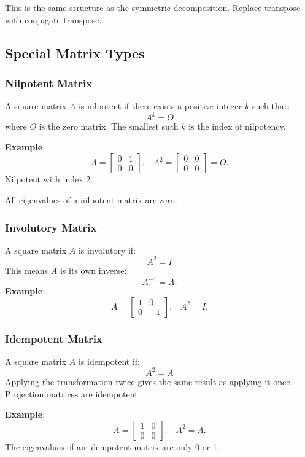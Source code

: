 \documentclass[
]{article}
\begin{document}
This is the same structure as the symmetric decomposition. Replace
transpose with conjugate transpose.

\subsection{Special Matrix Types}\label{special-matrix-types}

\subsubsection{Nilpotent Matrix}\label{nilpotent-matrix}

A square matrix \(A\) is nilpotent if there exists a positive integer
\(k\) such that:
\[
A^k = O
\]
where \(O\) is the zero matrix. The smallest such \(k\) is the index of
nilpotency.

\textbf{Example}:
\[
A =
\begin{bmatrix}
0 & 1 \\
0 & 0
\end{bmatrix}. \quad A^2 = \begin{bmatrix} 0 & 0 \\ 0 & 0 \end{bmatrix} = O.
\]
Nilpotent with index 2.

All eigenvalues of a nilpotent matrix are zero.

\subsubsection{Involutory Matrix}\label{involutory-matrix}

A square matrix \(A\) is involutory if:
\[
A^2 = I
\]
This means \(A\) is its own inverse:
\[
A^{-1} = A.
\]
\textbf{Example}:
\[
A =
\begin{bmatrix}
1 & 0 \\
0 & -1
\end{bmatrix}. \quad A^2 = I.
\]
\subsubsection{Idempotent Matrix}\label{idempotent-matrix}

A square matrix \(A\) is idempotent if:
\[
A^2 = A
\]
Applying the transformation twice gives the same result as applying it
once. Projection matrices are idempotent.

\textbf{Example}:
\[
A =
\begin{bmatrix}
1 & 0 \\
0 & 0
\end{bmatrix}. \quad A^2 = A.
\]
The eigenvalues of an idempotent matrix are only 0 or 1.
\end{document}
